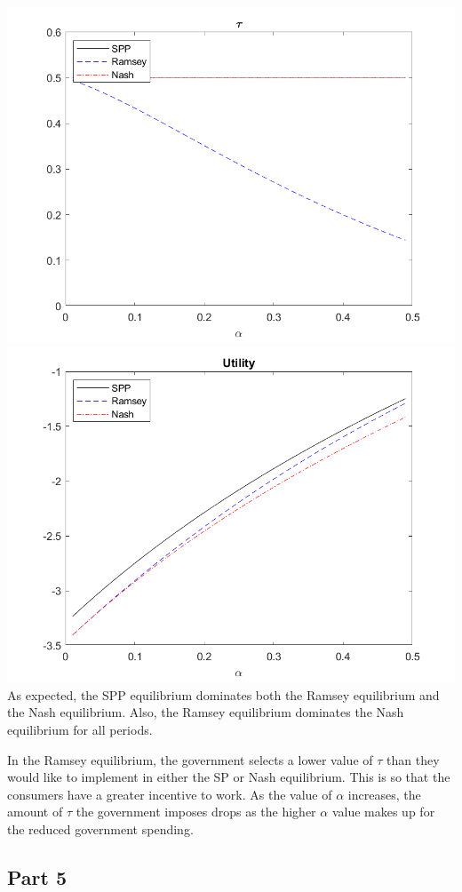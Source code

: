 \documentclass[11pt]{article} %
\begin{document}
\includegraphics{tau}
\includegraphics{util}
As expected, the SPP equilibrium dominates both the Ramsey equilibrium and the Nash equilibrium. Also, the Ramsey equilibrium dominates the Nash equilibrium for all periods.

In the Ramsey equilibrium, the government selects a lower value of $\tau$ than they would like to implement in either the SP or Nash equilibrium. This is so that the consumers have a greater incentive to work. As the value of $\alpha$ increases, the amount of $\tau$ the government imposes drops as the higher $\alpha$ value makes up for the reduced government spending.

\subsection{Part 5}
\end{document}
